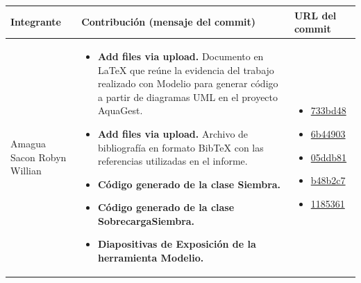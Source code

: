 \documentclass[11pt,a4paper]{article}
\begin{document}
\begin{tabularx}{\textwidth}{
>{\raggedright\arraybackslash}p{}
>{\raggedright\arraybackslash}X
>{\raggedright\arraybackslash}p{}
}
\toprule
\textbf{Integrante} & \textbf{Contribución (mensaje del commit)} & \textbf{URL del commit} \\
\midrule

Amagua Sacon Robyn Willian &
\begin{itemize}[leftmargin=*,nosep,itemsep=2pt]
    \item \textbf{Add files via upload.} Documento en LaTeX que reúne la evidencia del trabajo realizado con Modelio para generar código a partir de diagramas UML en el proyecto AquaGest.
    \item \textbf{Add files via upload.} Archivo de bibliografía en formato BibTeX con las referencias utilizadas en el informe.
    \item \textbf{Código generado de la clase Siembra.}
    \item \textbf{Código generado de la clase SobrecargaSiembra.}
    \item \textbf{Diapositivas de Exposición de la herramienta Modelio.}
\end{itemize} &
\begin{itemize}[leftmargin=*,nosep,itemsep=2pt]
    \item \href{https://github.com/erizzov-boop/PFC-AquaGest-MDD-Equipo_D-/commit/733bd48c5aa8d644316a9d1d99432ee01166b8e6}{733bd48}
    \item \href{https://github.com/erizzov-boop/PFC-AquaGest-MDD-Equipo_D-/commit/6b44903f906eb46bc1c1df2e47a9f55b36ffd855}{6b44903}
    \item \href{https://github.com/erizzov-boop/PFC-AquaGest-MDD-Equipo_D-/commit/05ddb819f208bbfa3a87db02157e54e234072dba}{05ddb81}
    \item \href{https://github.com/erizzov-boop/PFC-AquaGest-MDD-Equipo_D-/commit/b48b2c76bb84dee90b6d2e8c74deee80e02218c3}{b48b2c7}
    \item \href{https://github.com/erizzov-boop/PFC-AquaGest-MDD-Equipo_D-/commit/11853614a42dd13a97bd3a23646500306fac05f4}{1185361}
\end{itemize} \\

\midrule


\end{tabularx}
\end{document}
